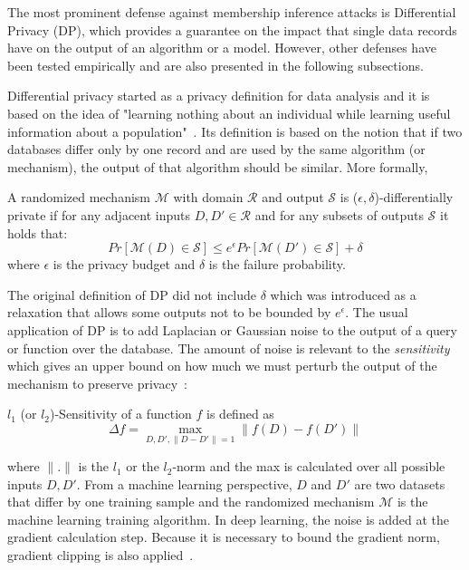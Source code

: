 The most prominent defense against membership inference attacks is Differential Privacy (DP), which provides a guarantee on the impact that single data records have on the output of an algorithm or a model. However, other defenses have been tested empirically and are also presented in the following subsections.

Differential privacy started as a privacy definition for data analysis and it is based on the idea of "learning nothing about an individual while learning useful information about a population"~. Its definition is based on the notion that if two databases differ only by one record and are used by the same algorithm (or mechanism), the output of that algorithm should be similar. More formally,
\begin{definition}
A randomized mechanism $\mathcal{M}$ with domain $\mathcal{R}$ and output $\mathcal{S}$ is ($\epsilon,\delta$)-differentially private if for any adjacent inputs $D, D' \in \mathcal{R}$ and for any subsets of outputs $\mathcal{S}$ it holds that:
\begin{equation}
  Pr[\mathcal{M}(D) \in \mathcal{S} ] \leq e^{\epsilon} Pr[\mathcal{M}(D') \in \mathcal{S} ] +\delta  
\end{equation}
where $\epsilon$ is the privacy budget and $\delta$ is the failure probability. 
\end{definition}
The original definition of DP did not include $\delta$ which was introduced as a relaxation that allows some outputs not to be bounded by $e^{\epsilon}$. 
The usual application of DP is to add Laplacian or Gaussian noise to the output of a query or function over the database. The amount of noise is relevant to the \textit{sensitivity} which gives an upper bound on how much we must perturb the output of the mechanism to preserve privacy~:
\begin{definition}
$l_{1}$ (or $l_{2}$)-Sensitivity of a function $f$ is defined as  
\begin{equation}
  \Delta f = \underset{D, D', \|D-D'\|=1}{\max} \|f(D) - f(D')\|  
\end{equation}
\end{definition}
where $\|.\|$ is the $l_1$ or the $l_2$-norm and the max is calculated over all possible inputs $D, D'$. 
From a machine learning perspective, $D$ and $D'$ are two datasets that differ by one training sample and the randomized mechanism $\mathcal{M}$ is the machine learning training algorithm. In deep learning, the noise is added at the gradient calculation step. Because it is necessary to bound the gradient norm, gradient clipping is also applied~.
